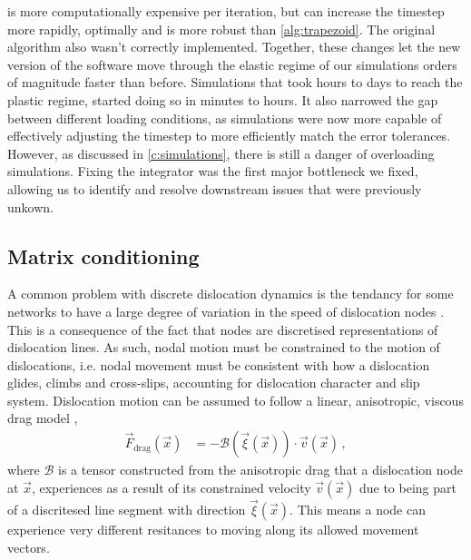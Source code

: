  is more computationally expensive per iteration, but can increase the timestep more rapidly, optimally and is more robust than \cref{alg:trapezoid}. The original algorithm also wasn't correctly implemented. Together, these changes let the new version of the software move through the elastic regime of our simulations orders of magnitude faster than before. Simulations that took hours to days to reach the plastic regime, started doing so in minutes to hours. It also narrowed the gap between different loading conditions, as simulations were now more capable of effectively adjusting the timestep to more efficiently match the error tolerances. However, as discussed in \cref{c:simulations}, there is still a danger of overloading simulations. Fixing the integrator was the first major bottleneck we fixed, allowing us to identify and resolve downstream issues that were previously unkown.

\subsection{Matrix conditioning}
\label{ss:matrix}

A common problem with discrete dislocation dynamics is the tendancy for some networks to have a large degree of variation in the speed of dislocation nodes \cite{bertin2019gpu,ddlab,arsenlis2007enabling}. This is a consequence of the fact that nodes are discretised representations of dislocation lines. As such, nodal motion must be constrained to the motion of dislocations, i.e. nodal movement must be consistent with how a dislocation glides, climbs and cross-slips, accounting for dislocation character and slip system. Dislocation motion can be assumed to follow a linear, anisotropic, viscous drag model \cite{ddlab},
\begin{align}\label{eq:dragCoef}
  \vec{F}_\textrm{drag}(\vec{x}) & = -\mathcal{B}(\vec{\xi}(\vec{x})) \cdot \vec{v}(\vec{x})\,,
\end{align}
where $\mathcal{B}$ is a tensor constructed from the anisotropic drag that a dislocation node at $\vec{x}$, experiences as a result of its constrained velocity $\vec{v}(\vec{x})$ due to being part of a discritesed line segment with direction $\vec{\xi}(\vec{x})$. This means a node can experience very different resitances to moving along its allowed movement vectors.

